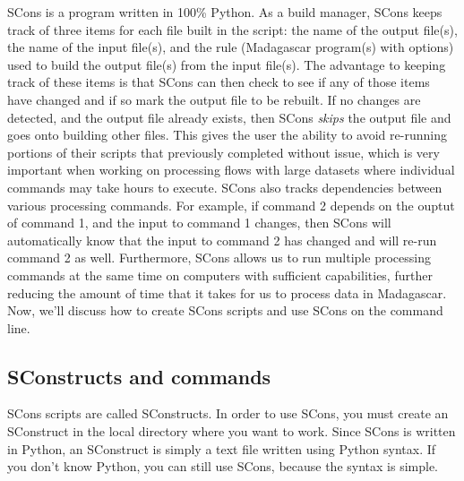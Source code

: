 SCons is a program written in 100\% Python.  As a build manager, SCons keeps track of three items for each file built in the script: the name of the output file(s), the name of the input file(s), and the rule (Madagascar program(s) with options) used to build the output file(s) from the input file(s).  The advantage to keeping track of these items is that SCons can then check to see if any of those items have changed and if so mark the output file to be rebuilt.  If no changes are detected, and the output file already exists, then SCons \emph{skips} the output file and goes onto building other files.  This gives the user the ability to avoid re-running portions of their scripts that previously completed without issue, which is very important when working on processing flows with large datasets where individual commands may take hours to execute.  SCons also tracks dependencies between various processing commands.  For example, if command 2 depends on the ouptut of command 1, and the input to command 1 changes, then SCons will automatically know that the input to command 2 has changed and will re-run command 2 as well.  Furthermore, SCons allows us to run multiple processing commands at the same time on computers with sufficient capabilities, further reducing the amount of time that it takes for us to process data in Madagascar.  Now, we'll discuss how to create SCons scripts and use SCons on the command line.

\subsection{SConstructs and commands}

SCons scripts are called SConstructs.  In order to use SCons, you must create an SConstruct in the local directory where you want to work. Since SCons is written in Python, an SConstruct is simply a text file written using Python syntax.  If you don't know Python, you can still use SCons, because the syntax is simple.

